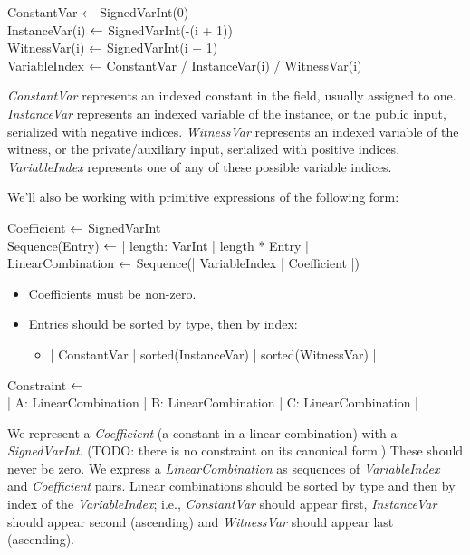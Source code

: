 {\ttfamily
ConstantVar $\shortleftarrow$  SignedVarInt(0)\\
InstanceVar(i) $\shortleftarrow$  SignedVarInt(-(i + 1))\\
WitnessVar(i) $\shortleftarrow$  SignedVarInt(i + 1)\\
VariableIndex $\shortleftarrow$ ConstantVar / InstanceVar(i) / WitnessVar(i)
}

\emph{ConstantVar} represents an indexed constant in the field, usually assigned to one. 
\emph{InstanceVar} represents an indexed variable of the instance, or the public input, serialized with negative indices. 
\emph{WitnessVar} represents an indexed variable of the witness, or the private/auxiliary input, serialized with positive indices. 
\emph{VariableIndex} represents one of any of these possible variable indices.

We'll also be working with primitive expressions of the following form:

{\ttfamily
Coefficient $\shortleftarrow$ SignedVarInt \\
Sequence(Entry) $\shortleftarrow$  | length: VarInt | length * Entry | \\
LinearCombination $\shortleftarrow$  Sequence(| VariableIndex | Coefficient |)
}
\begin{itemize}
    \item Coefficients must be non-zero.
    \item Entries should be sorted by type, then by index:
		\begin{itemize}
        \item | ConstantVar | sorted(InstanceVar) | sorted(WitnessVar) |
		\end{itemize}
\end{itemize}

{\ttfamily
Constraint $\shortleftarrow$  \\
| A: LinearCombination | B: LinearCombination | C: LinearCombination |
}

We represent a \emph{Coefficient} (a constant in a linear combination) with a \emph{SignedVarInt}. 
(TODO: there is no constraint on its canonical form.) These should never be zero. 
We express a \emph{LinearCombination} as sequences of \emph{VariableIndex} and \emph{Coefficient} pairs. 
Linear combinations should be sorted by type and then by index of the \emph{VariableIndex}; 
i.e., \emph{ConstantVar} should appear first, \emph{InstanceVar} should appear second (ascending) and \emph{WitnessVar} should appear last (ascending).

